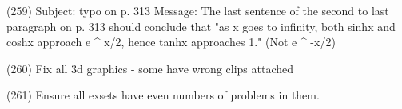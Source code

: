 {(259) Subject: typo on p. 313
Message: The last sentence of the second to last paragraph on p. 313 should conclude that "as x goes to infinity, both sinhx and coshx approach e ^ x/2, hence tanhx approaches 1." (Not e ^ -x/2)

(260) Fix all 3d graphics - some have wrong clips attached

(261) Ensure all exsets have even numbers of problems in them.


}
